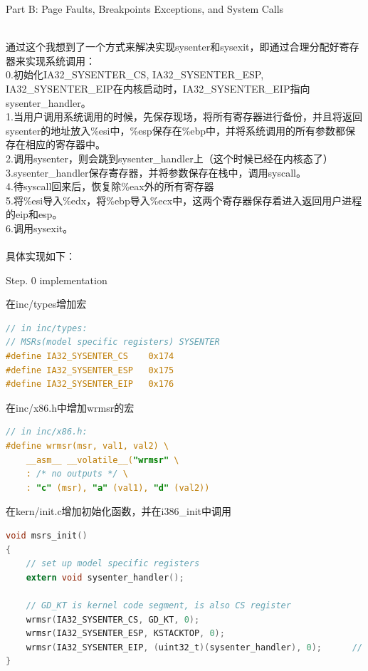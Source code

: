 \documentclass[GBK,winfonts,a4paper,10pt]{ctexart}
\begin{document}
\begin{section}{ Part B: Page Faults, Breakpoints Exceptions, and System Calls }
\begin{subsection}{ \color[rgb]{1,0,0}{Challenge 3: sysenter/sysexit} }
~\\
通过这个我想到了一个方式来解决实现sysenter和sysexit，即通过合理分配好寄存器来实现系统调用：	\\
0.初始化IA32\_SYSENTER\_CS, IA32\_SYSENTER\_ESP, IA32\_SYSENTER\_EIP在内核启动时，IA32\_SYSENTER\_EIP指向sysenter\_handler。 \\
1.当用户调用系统调用的时候，先保存现场，将所有寄存器进行备份，并且将返回sysenter的地址放入\%esi中，\%esp保存在\%ebp中，并将系统调用的所有参数都保存在相应的寄存器中。\\
2.调用sysenter，则会跳到sysenter\_handler上（这个时候已经在内核态了）		\\
3.sysenter\_handler保存寄存器，并将参数保存在栈中，调用syscall。			\\
4.待syscall回来后，恢复除\%eax外的所有寄存器								\\
5.将\%esi导入\%edx，将\%ebp导入\%ecx中，这两个寄存器保存着进入返回用户进程的eip和esp。		\\
6.调用sysexit。	\\
~\\
具体实现如下：	
\begin{subsubsection}{ Step. 0 implementation }
\par
在inc/types增加宏	\par
\begin{lstlisting}[language=C]
// in inc/types:
// MSRs(model specific registers) SYSENTER
#define IA32_SYSENTER_CS	0x174
#define IA32_SYSENTER_ESP	0x175
#define IA32_SYSENTER_EIP	0x176
\end{lstlisting}

\par
在inc/x86.h中增加wrmsr的宏	\par
\begin{lstlisting}[language=C]
// in inc/x86.h:
#define wrmsr(msr, val1, val2) \
	__asm__ __volatile__("wrmsr" \
	: /* no outputs */ \
	: "c" (msr), "a" (val1), "d" (val2))
\end{lstlisting}

\par
在kern/init.c增加初始化函数，并在i386\_init中调用	\par
\begin{lstlisting}[language=C]
void msrs_init()
{
	// set up model specific registers
	extern void sysenter_handler();

	// GD_KT is kernel code segment, is also CS register
	wrmsr(IA32_SYSENTER_CS, GD_KT, 0);
	wrmsr(IA32_SYSENTER_ESP, KSTACKTOP, 0);
	wrmsr(IA32_SYSENTER_EIP, (uint32_t)(sysenter_handler), 0);		// entry of sysenter
}
\end{lstlisting}
\end{subsubsection}


\end{subsection}
\end{section}
\end{document}
